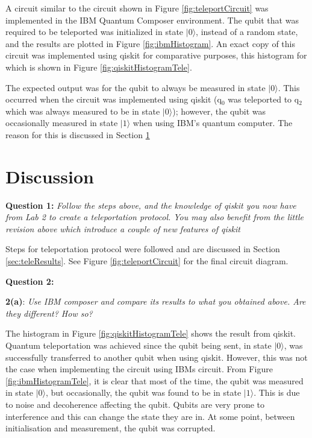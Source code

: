 A circuit similar to the circuit shown in Figure \ref{fig:teleportCircuit} was implemented in the IBM Quantum Composer environment. The qubit that was required to be teleported was initialized in state $|0\rangle$, instead of a random state, and the results are plotted in Figure \ref{fig:ibmHistogram}. An exact copy of this circuit was implemented using qiskit for comparative purposes, this histogram for which is shown in Figure \ref{fig:qiskitHistogramTele}.

The expected output was for the qubit to always be measured in state $|0\rangle$. This occurred when the circuit was implemented using qiskit (q$_0$ was teleported to q$_2$ which was always measured to be in state $|0\rangle$); however, the qubit was occasionally measured in state $|1\rangle$ when using IBM's quantum computer. The reason for this is discussed in Section \ref{sec:discussTeleport}

\section{Discussion} \label{sec:discussTeleport}
\textbf{Question 1:}
\textit{Follow the steps above, and the knowledge of qiskit you now have from Lab 2 to create a teleportation protocol. You may also benefit from the little revision above which introduce a couple of new features of qiskit}

Steps for teleportation protocol were followed and are discussed in Section \ref{sec:teleResults}. See Figure \ref{fig:teleportCircuit} for the final circuit diagram.

\textbf{Question 2:}

\textbf{2(a)}: \textit{Use IBM composer and compare its results to what you obtained above. Are they different? How so?}


The histogram in Figure \ref{fig:qiskitHistogramTele} shows the result from qiskit. Quantum teleportation was achieved since the qubit being sent, in state $|0\rangle$, was successfully transferred to another qubit when using qiskit. However, this was not the case when implementing the circuit using IBMs circuit. From Figure \ref{fig:ibmHistogramTele}, it is clear that most of the time, the qubit was measured in state $|0\rangle$, but occasionally, the qubit was found to be in state $|1\rangle$. This is due to noise and decoherence affecting the qubit. Qubits are very prone to interference and this can change the state they are in. At some point, between initialisation and measurement, the qubit was corrupted.

